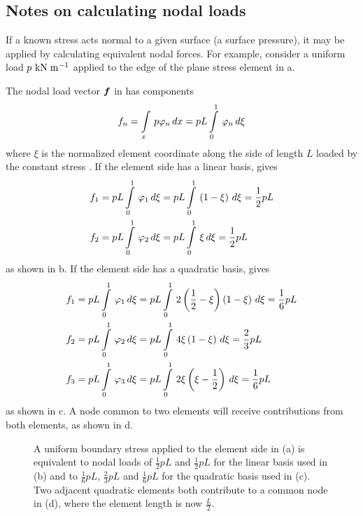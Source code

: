 \subsection{Notes on calculating nodal loads}
\label{sec:noteoncalc}

If a known stress acts normal to a given surface (\eg a surface pressure), it
may be applied by calculating equivalent nodal forces. For example, consider a
uniform load $ p~\mathrm{\mathrm{kN}\thickspace\mathrm{m}^{-1}} $ applied to the edge of the plane stress
element in a.

The nodal load vector $\boldsymbol{f}$ in  has components
\begin{equation}
  f_{n} =    \displaystyle\int\limits_{x}^{} \,p  \varphi_{n} \,dx   = pL   \displaystyle\int\limits_{0}^{1} \, \varphi_{n} \,d\xi 
  \label{eqn:nlv}
\end{equation}  
where $\xi$ is the normalized element coordinate along the side of length $L$
loaded by the constant stress . If the element side has a
linear basis,  gives
\begin{align*}
  f_{1} &= pL  \displaystyle\int\limits_{0}^{1} \, \varphi_{1} \,d\xi  = pL  \displaystyle\int\limits_{0}^{1} \,\left( 1-\xi \right)\,d\xi  =
  \dfrac{1}{2} pL \\
  f_{2} &= pL  \displaystyle\int\limits_{0}^{1} \, \varphi_{2} \,d\xi  = pL  \displaystyle\int\limits_{0}^{1} \,\xi\,d\xi  = \dfrac{1}{2} pL
\end{align*}
as shown in b. If the element side has a
quadratic basis,  gives 
\begin{align*}
  f_{1} &= pL  \displaystyle\int\limits_{0}^{1} \, \varphi_{1} \,d\xi  =
  pL  \displaystyle\int\limits_{0}^{1} \,2\left( \dfrac{1}{2}-\xi \right)\left( 1-\xi \right)\,d\xi  = \frac{1}{6} pL \\
  f_{2} &= pL  \displaystyle\int\limits_{0}^{1} \, \varphi_{2} \,d\xi  = pL   \displaystyle\int\limits_{0}^{1} \,4\xi\left( 1-\xi \right)\,d\xi   
  = \frac{2}{3} pL \\
  f_{3} &= pL  \displaystyle\int\limits_{0}^{1} \, \varphi_{3} \,d\xi  = pL   \displaystyle\int\limits_{0}^{1} \,2\xi\left( \xi -
      \dfrac{1}{2} \right)\,d\xi  = \frac{1}{6} pL
\end{align*}
as shown in c. A node common to two elements will
receive contributions from both elements, as shown in
d.

\begin{figure}[htbp] \centering
  
  \caption{A uniform boundary stress applied to the element side in (a) is 
   equivalent to nodal loads of $\frac{1}{2} pL$ and $\frac{1}{2} pL$ for the 
   linear basis used in (b) and to  $\frac{1}{6}pL$,  $\frac{2}{3}pL$ and  
   $\frac{1}{6}pL$ for the quadratic basis used in (c). Two adjacent quadratic
   elements both contribute to a common node in (d), where the element 
   length is now $\frac{L}{2}$.}
  \label{fig:uniformbound}
\end{figure}


